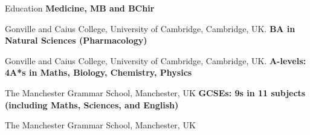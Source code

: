 \begin{rubric}{Education}
\entry*[09.2026 - Ongoing]%
	\textbf{Medicine, MB and BChir}\par
	Gonville and Caius College, University of Cambridge, Cambridge, UK.
%
\entry*[09.2023 – 07.2026]%
	\textbf{BA in Natural Sciences (Pharmacology)}\par
	Gonville and Caius College, University of Cambridge, Cambridge, UK.
% 
\entry*[09.2021 – 07.2023]%
	\textbf{A-levels: 4A*s in Maths, Biology, Chemistry, Physics}\par
	The Manchester Grammar School, Manchester, UK
%
\entry*[09.2019 – 07.2021]%
	\textbf{GCSEs: 9s in 11 subjects (including Maths, Sciences, and English)}\par
	The Manchester Grammar School, Manchester, UK
\end{rubric}